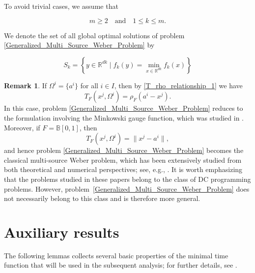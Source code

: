 \documentclass[sn-mathphys-num]{sn-jnl}%
\theoremstyle{definition}
\newtheorem{remark}[theorem]{Remark}
\begin{document}
To avoid trivial cases, we assume that

\begin{equation}
	\label{m_k_condition}
	m\ge 2 \quad \text{and} \quad 1\le k\le m .
\end{equation}

We denote the set of all global optimal solutions of problem \eqref{Generalized_Multi_Source_Weber_Problem} by

\begin{equation}
	\label{Generalized_ Multi_Source_Weber_Problem_Solutions}
	S_k= \left\{ y \in \mathbb{R}^{dk}\mid f_k(y)= \min_{x\in \mathbb{R}^{dk}} f_k(x) \right\} 
\end{equation}


\begin{remark}
	If $\Omega^i=\{a^i\}$ for all $i\in I$, then by \eqref{T_rho_relationship_1} we have
	\[
	T_F(x^j,\Omega^i)=\rho_F(a^i-x^j).
	\]
	In this case, problem \eqref{Generalized_Multi_Source_Weber_Problem} reduces to the formulation involving the Minkowski gauge function, which was studied in \cite{LNTV}.
	Moreover, if $F=\mathbb{B}[0,1]$, then
	\begin{equation*}
		\label{Preliminaries_3}
		T_F(x^j,\Omega^i)=\|x^j-a^i\|,
	\end{equation*}
	and hence problem \eqref{Generalized_Multi_Source_Weber_Problem} becomes the classical multi-source Weber problem, which has been extensively studied from both theoretical and numerical perspectives; see, e.g., \cite{cuong2020qualitative, cuong2023global, CTWYOptim, Cuong2024}. It is worth emphasizing that the problems studied in these papers belong to the class of DC programming problems. However, problem~\eqref{Generalized_Multi_Source_Weber_Problem} does not necessarily belong to this class and is therefore more general.
\end{remark}

\section{Auxiliary results}\label{au}

The following lemmas collects several basic properties of the minimal time function that will be used in the subsequent analysis; for further details, see \cite{long2021new,long2022invariant,long2023directional,mordukhovich2023easy}.
\end{document}
